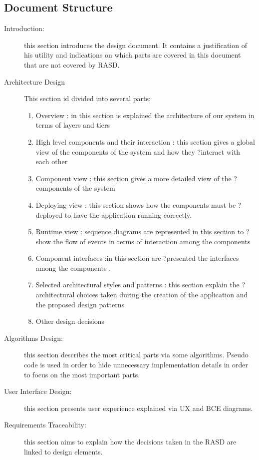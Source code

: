 \documentclass{article}
\begin{document}
\subsection{Document Structure} %
\begin{description}
\item [Introduction:] this section introduces the design document. It contains a justification of his utility and indications on which parts are covered in this document that are not covered by RASD. 
\item  [Architecture Design ]  This section id divided into several parts:
\begin {enumerate}
\item  Overview : in this section is explained the architecture of our system in terms of layers and tiers
\item High level components and their interaction : this section gives a global view of the components of the system and how they ?interact with each other
\item Component view : this section gives a more detailed view of the ?components of the system
\item Deploying view : this section shows how the components must be ?deployed to have the application running correctly. 
\item Runtime view : sequence diagrams are represented in this section to ?show the flow of events in terms of interaction among the components
\item Component interfaces :in this section are ?presented the interfaces among the components .
\item Selected architectural styles and patterns : this section explain the ?architectural choices taken during the creation of the application and the proposed design patterns 
\item Other design decisions 
\end{enumerate}
\item  [Algorithms Design:] this section describes the most critical parts via some algorithms. Pseudo code is used in order to hide unnecessary implementation details in order to focus on the most important parts.
\item  [User Interface Design:] this section presents user experience explained via UX and BCE diagrams. 
\item  [Requirements Traceability:] this section aims to explain how the decisions taken in the RASD are linked to design elements.
\end{description}
\end{document}

